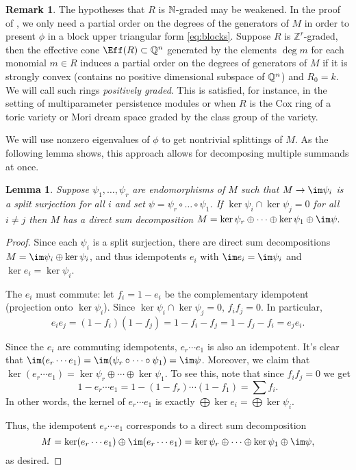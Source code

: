 \documentclass[12pt]{article}
\def\ZZ{\mathbb Z}
\theoremstyle{theorem}
\numberwithin{thm}{section}
\newtheorem{lem}[thm]{Lemma}
\theoremstyle{definition}
\newtheorem{rem}[thm]{Remark}
\begin{document}
\begin{rem}\label{rem:grading}
  The hypotheses that $R$ is $\mathbb N$-graded may be weakened. In the proof of , we only need a partial order on the degrees of the generators of $M$ in order to present $\phi$ in a block upper triangular form \eqref{eq:blocks}. Suppose $R$ is $\ZZ^r$-graded, then the effective cone $\Eff(R)\subset\Q^n$ generated by the elements $\deg m$ for each monomial $m \in R$ induces a partial order on the degrees of generators of $M$ if it is strongly convex (contains no positive dimensional subspace of $\mathbb Q^n$) and $R_0 = k$. We will call such rings \emph{positively graded}. %
  This is satisfied, for instance, in the setting of multiparameter persistence modules or when $R$ is the Cox ring of a toric variety or Mori dream space graded by the class group of the variety.
\end{rem}

We will use nonzero eigenvalues of $\phi$ to get nontrivial splittings of $M$. As the following lemma shows, this approach allows for decomposing multiple summands at once.

\begin{lem}\label{lem:decomposition}
  Suppose $\psi_1,\dots,\psi_r$ are endomorphisms of $M$ such that $M\to\im\psi_i$ is a split surjection for all $i$ and set $\psi = \psi_r\circ\dots\circ\psi_1$.
  If $\ker\psi_i\cap\ker \psi_j = 0$ for all $i\neq j$ then $M$ has a direct sum decomposition \( M = \ker\psi_r \oplus \cdots \oplus \ker\psi_1 \oplus \im\psi. \)
\end{lem}
\begin{proof}
  Since each $\psi_i$ is a split surjection, there are direct sum decompositions $M=\im \psi_i \oplus \ker \psi_i$, and thus idempotents $e_i$ with $\im e_i = \im \psi_i$ and $\ker e_i = \ker \psi_i$.

  The $e_i$ must commute: let $f_i = 1- e_i$ be the complementary idempotent (projection onto $\ker \psi_i$). Since $\ker \psi_i \cap \ker \psi_j=0$, $f_if_j=0$. In particular,
  \[ e_ie_j =(1-f_i)(1-f_j) = 1-f_i-f_j= 1-f_j-f_i = e_j e_i. \]

  Since the $e_i$ are commuting idempotents, $e_r\cdots e_1$ is also an idempotent. It's clear that $\im(e_r\cdots e_1) = \im (\psi_r\circ \dots\circ \psi_1) = \im \psi$. Moreover, we claim that $\ker(e_r\cdots e_1) = \ker \psi_r \oplus \cdots \oplus \ker \psi_1$. To see this, note that since $f_if_j=0$ we get
  \[ 1-e_r\cdots e_1 = 1-(1-f_r)\cdots (1-f_1) = \sum f_i. \]
  In other words, the kernel of $e_r\cdots e_1$ is exactly $\bigoplus \ker e_i =\bigoplus \ker \psi_i$.

  Thus, the idempotent $e_r\cdots e_1$ corresponds to a direct sum decomposition
  \[ M = \ker(e_r\cdots e_1) \oplus \im(e_r\cdots e_1) = \ker\psi_r \oplus \cdots \oplus \ker\psi_1 \oplus \im\psi, \]
  as desired.
\end{proof}
\end{document}
